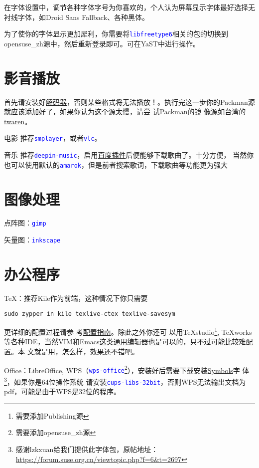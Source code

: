\documentclass[11pt]{article}
\newcommand{\soft}[1]{\texttt{\textcolor{blue}{#1}}}
\begin{document}
在字体设置中，调节各种字体字号为你喜欢的，个人认为屏幕显示字体最好选择无衬线字体，如Droid Sans Fallback、各种黑体。

为了使你的字体显示更加犀利，你需要将\soft{libfreetype6}相关的包的切换到opensuse\_zh源中，然后重新登录即可。可在YaST中进行操作。
\section{影音播放}
{\color{orange}首先请安装好\href{https://lug.ustc.edu.cn/sites/opensuse-guide/codecs.php}{解码器}，否则某些格式将无法播放！}。执行完这一步你的Packman源
就应该添加好了，如果你认为这个源太慢，请尝
试Packman的\href{http://packman.links2linux.org/mirrors}{镜%
像源}如台湾的\href{http://ftp.twaren.net/Linux/Packman/}{twaren}。
\begin{compactdesc}
 \item[电影] 推荐\soft{smplayer}，或者\soft{vlc}。
 \item[音乐] 推荐\soft{deepin-music}，启用\href{https://forum.suse.org.cn/viewtopic.php?f=7&t=2530}{百度插件}后便能够下载歌曲了。十分方便，
当然你也可以使用默认的\soft{amarok}，但是前者搜索歌词，下载歌曲等功能更为强大
\end{compactdesc}
\section{图像处理}
点阵图：\soft{gimp}

矢量图：\soft{inkscape}
\section{办公程序}
\TeX ：推荐Kile作为前端，这种情况下你只需要
\begin{Verbatim}[formatcom=\color{codecolor}]
    sudo zypper in kile texlive-ctex texlive-savesym
\end{Verbatim}
更详细的配置过程请参
考\href{https://forum.suse.org.cn/viewtopic.php?f=6&t=2392&p=18750}{配置指南}。除此之外你还可
以用\TeX studio\footnote{需要添加Publishing源}, \TeX works等各种IDE，当然VIM和Emacs这类通用编辑器也是可以的，只不过可能比较难配置。本
文就是用，怎么样，效果还不错吧。

Office：LibreOffice, WPS（\soft{wps-office}\footnote{需要添加opensuse\_zh源}），安装好后需要下载安装\href{http://pan.baidu.com/s/1mgC3A0C}{Symbols}字
体\footnote{感谢lzkxuan给我们提供此字体包，原帖地址：\url{https://forum.suse.org.cn/viewtopic.php?f=6&t=2697}}，如果你是64位操作系统
请安装\soft{cups-libs-32bit}，否则WPS无法输出文档为pdf，可能是由于WPS是32位的程序。
\end{document}
